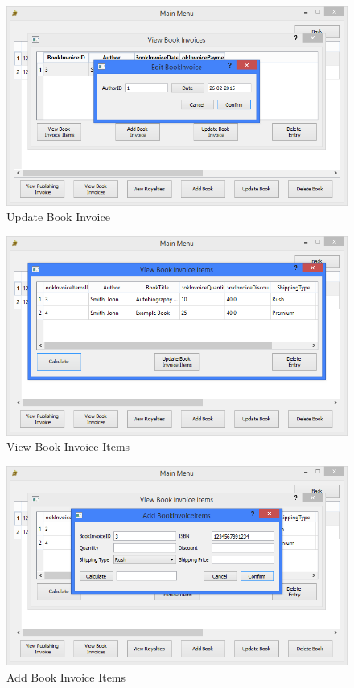 \begin{figure}[H]
    \caption{Update Book Invoice} \label{fig:UpdateBookInvoice}
    \includegraphics[width=\textwidth]{./Maintenance/UserInterface/UpdateBookInvoice.png}
\end{figure}

\begin{figure}[H]
    \caption{View Book Invoice Items} \label{fig:ViewBookInvoiceItems}
    \includegraphics[width=\textwidth]{./Maintenance/UserInterface/ViewBookInvoiceItems.png}
\end{figure}

\begin{figure}[H]
    \caption{Add Book Invoice Items} \label{fig:AddBookInvoiceItems}
    \includegraphics[width=\textwidth]{./Maintenance/UserInterface/AddBookInvoiceItems.png}
\end{figure}

